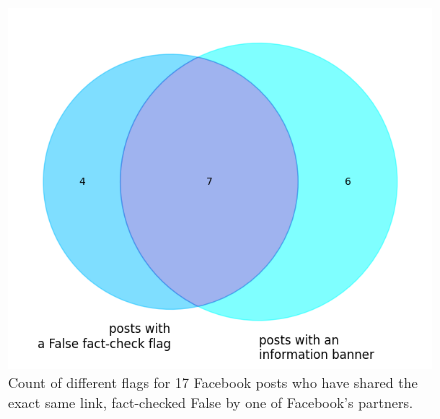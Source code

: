 \documentclass{article}
\begin{document}

\begin{figure}[h]
\centering
\includegraphics[scale=0.4]{../figure/facebook_pie_flags_updated.png}
\caption{Count of different flags for 17 Facebook posts who have shared the exact same link, fact-checked False by one of Facebook’s partners. }
\label{tab_flags_fb}
\end{figure}
\end{document}
